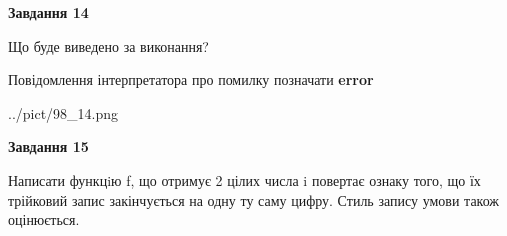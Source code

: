 \documentclass[11pt, ukrainian]{article}
\begin{document}
{\begin {large}
{\begin {center}\textbf{Завдання 14}\end {center}}\par
Що буде виведено за виконання? \par
Повідомлення інтерпретатора про помилку позначати \textbf{error}

\begin{center}
	{../pict/98_14.png}
\end{center}
\newpage

{\begin {center}\textbf{Завдання 15}\end {center}}\par

Написати функцiю f, що отримує 2 цілих числа i повертає ознаку того, що їх трійковий запис закінчується на одну ту саму цифру. Стиль запису умови також оцінюється.\par
\newpage

\end {large}}
\end{document}
